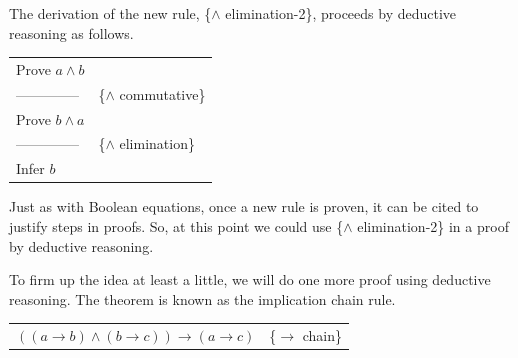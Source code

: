 The derivation of the new rule, \{$\wedge$ elimination-2\},
proceeds by deductive reasoning as follows.
\begin{center}
\begin{tabular}{ll}
Prove $a \wedge b$                 & \\
--------------                     &\{$\wedge$ commutative\} \\
Prove $b \wedge a$                 & \\
--------------                     &\{$\wedge$ elimination\} \\
Infer $b$                          & \\
\end{tabular}
\end{center}

Just as with Boolean equations, once a new rule is proven, it
can be cited to justify steps in proofs.
So, at this point we could use \{$\wedge$ elimination-2\}
in a proof by deductive reasoning.

To firm up the idea at least a little,
we will do one more proof using deductive reasoning.
The theorem is known as the implication chain rule.

\begin{center}
\begin{tabular}{ll}
$((a \rightarrow b) \wedge (b \rightarrow c)) \rightarrow (a \rightarrow c)$ &\{$\rightarrow$ chain\}
\end{tabular}
\end{center}

